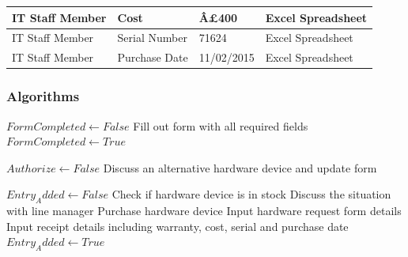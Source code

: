 \begin{center}
\begin{tabular}{|p{3cm}|p{3cm}|p{4cm}|p{3cm}|}
IT Staff Member                       & Cost                              & Â£400                                               & Excel Spreadsheet        \\ \hline
IT Staff Member                       & Serial Number                      & 71624                                          &  Excel Spreadsheet           \\ \hline
IT Staff Member                       & Purchase Date                      & 11/02/2015                                         &  Excel Spreadsheet           \\ \hline
\end{tabular}
\end{center}

\subsubsection{Algorithms}

\begin{algorithm}[H]
\begin{algorithmic}
\State $FormCompleted  \leftarrow False$
	\State Fill out form with all required fields
	\State $FormCompleted \leftarrow True$
\Else
\EndIf
\end{algorithmic}
\end{algorithm}

\begin{algorithm}[H]
\begin{algorithmic}
\State$Authorize \leftarrow False$
		\State Discuss an alternative hardware device and update form
	\Else
	\EndIf
\EndWhile
\end{algorithmic}
\end{algorithm}


\begin{algorithm}[H]
\begin{algorithmic}
\State $Entry_Added \leftarrow False$
	\State Check if hardware device is in stock
		\State Discuss the situation with line manager
	\Else
		\State Purchase hardware device
		\State Input hardware request form details
		\State Input receipt details including warranty, cost, serial and purchase date
		\State $Entry_Added \leftarrow True$
	\EndIf
\EndWhile
\end{algorithmic}
\end{algorithm}
		

